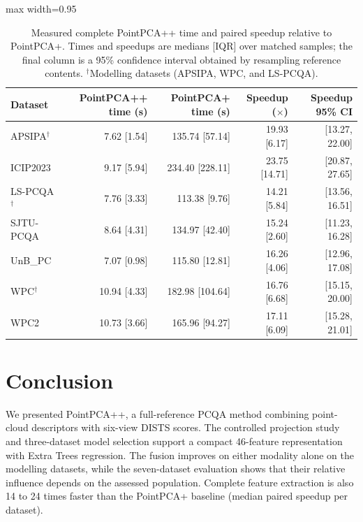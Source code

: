 \documentclass[final,3p,times,twocolumn]{elsarticle}
\begin{document}
\begin{table}[ht!]
    \centering
    \caption{Measured complete PointPCA++ time and paired speedup relative to PointPCA+. Times and speedups are medians [IQR] over matched samples; the final column is a 95\% confidence interval obtained by resampling reference contents. $^{\dagger}$Modelling datasets (APSIPA, WPC, and LS-PCQA).}
    \label{tab_pointpcapp_integrated_runtime}
    \scriptsize
    \begin{adjustbox}{max width=0.95\textwidth}
    \begin{tabular}{lrrrr}
        \toprule
        Dataset & PointPCA++ time (s) & PointPCA+ time (s) & Speedup ($\times$) & Speedup 95\% CI \\
        \midrule
        APSIPA$^{\dagger}$ & 7.62 [1.54] & 135.74 [57.14] & 19.93 [6.17] & [13.27, 22.00] \\
        ICIP2023 & 9.17 [5.94] & 234.40 [228.11] & 23.75 [14.71] & [20.87, 27.65] \\
        LS-PCQA$^{\dagger}$ & 7.76 [3.33] & 113.38 [9.76] & 14.21 [5.84] & [13.56, 16.51] \\
        SJTU-PCQA & 8.64 [4.31] & 134.97 [42.40] & 15.24 [2.60] & [11.23, 16.28] \\
        UnB\_PC & 7.07 [0.98] & 115.80 [12.81] & 16.26 [4.06] & [12.96, 17.08] \\
        WPC$^{\dagger}$ & 10.94 [4.33] & 182.98 [104.64] & 16.76 [6.68] & [15.15, 20.00] \\
        WPC2 & 10.73 [3.66] & 165.96 [94.27] & 17.11 [6.09] & [15.28, 21.01] \\
        \bottomrule

    \end{tabular}
    \end{adjustbox}
\end{table}




\section{Conclusion} \label{sec_conclusions}

We presented PointPCA++, a full-reference \gls{PCQA} method combining point-cloud descriptors with six-view \gls{DISTS} scores. The controlled projection study and three-dataset model selection support a compact 46-feature representation with Extra Trees regression. The fusion improves on either modality alone on the modelling datasets, while the seven-dataset evaluation shows that their relative influence depends on the assessed population. Complete feature extraction is also 14 to 24 times faster than the PointPCA+ baseline (median paired speedup per dataset).
\end{document}
